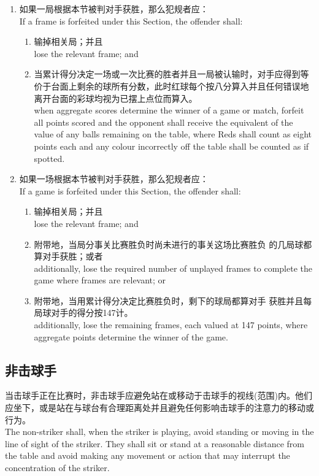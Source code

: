 \begin{enumerate}[label=(\alph*)]
    \item 如果一局根据本节被判对手获胜，那么犯规者应：\\
    If a frame is forfeited under this Section, the offender shall:
    \begin{enumerate}[label=(\roman*)]
        \item 输掉相关局；并且\\
        lose the relevant frame; and
        \item 当累计得分决定一场或一次比赛的胜者并且一局被认输时，对手应得到等价于台面上剩余的球所有分数，此时红球每个按八分算入并且任何错误地离开台面的彩球均视为已摆上点位而算入。\\
        when aggregate scores determine the winner of a game or match, forfeit all points scored and the opponent shall receive the equivalent of the value of any balls remaining on the table, where Reds shall count as eight points each and any colour incorrectly off the table shall be counted as if spotted.
    \end{enumerate}
    \item 如果一场根据本节被判对手获胜，那么犯规者应：\\
    If a game is forfeited under this Section, the offender shall:
    \begin{enumerate}[label=(\roman*)]
        \item 输掉相关局；并且\\
        lose the relevant frame; and
        \item 附带地，当局分事关比赛胜负时尚未进行的事关这场比赛胜负
        的几局球都算对手获胜；或者\\
        additionally, lose the required number of unplayed frames to complete the game where frames are relevant; or
        \item 附带地，当用累计得分决定比赛胜负时，剩下的球局都算对手
        获胜并且每局球对手的得分按147计。\\
        additionally, lose the remaining frames, each valued at 147 points, where aggregate points determine the winner of the game.
    \end{enumerate}
\end{enumerate}

\subsection{非击球手}

\noindent 当击球手正在比赛时，非击球手应避免站在或移动于击球手的视线(范围)内。他们应坐下，或是站在与球台有合理距离处并且避免任何影响击球手的注意力的移动或行为。\\
The non-striker shall, when the striker is playing, avoid standing or moving in the line of sight of the striker. They shall sit or stand at a reasonable distance from the table and avoid making any movement or action that may interrupt the concentration of the striker.

